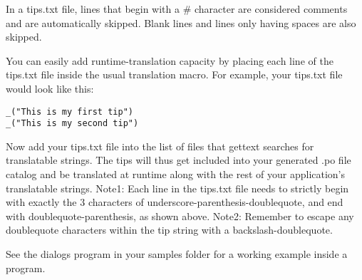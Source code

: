 In a tips.txt file, lines that begin with a \# character are considered comments 
and are automatically skipped. Blank lines and lines only having spaces are also 
skipped.

You can easily add runtime-translation capacity by placing each line of the 
tips.txt file inside the usual translation macro. For example, your tips.txt 
file would look like this:

\begin{verbatim}
_("This is my first tip")
_("This is my second tip")
\end{verbatim}

Now add your tips.txt file into the list of files that gettext searches 
for translatable strings. The tips will thus get included into your 
generated .po file catalog and be translated at runtime along with the rest of 
your application's translatable strings. 
Note1: Each line in the tips.txt file needs to strictly begin with exactly the 
3 characters of underscore-parenthesis-doublequote, and end with 
doublequote-parenthesis, as shown above. 
Note2: Remember to escape any doublequote characters within the tip string with
a backslash-doublequote.

See the dialogs program in your samples folder for a working example inside a 
program.

